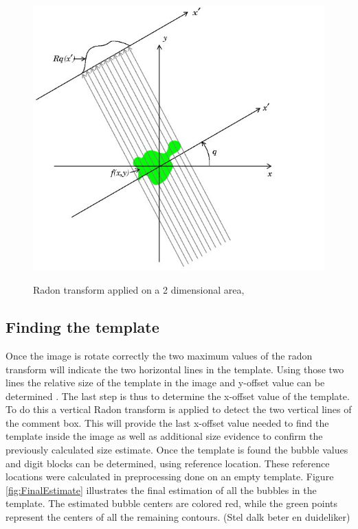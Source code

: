 \begin{figure}
  \centering
  \includegraphics[width=14cm]{RadonT}\\
  \caption{Radon transform applied on a 2 dimensional area, \citet{radon}}
  \label{fig:RadonT}
\end{figure}

\subsection{Finding the template}
\label{sec:findTemplate}

Once the image is rotate correctly the two maximum values of the radon transform will indicate the two horizontal lines in the template. Using those two lines the relative size of the template in the image and y-offset value can be determined . The last step is thus to determine the x-offset value of the template. To do this a vertical Radon transform is applied to detect the two vertical lines of the comment box. This will provide the last x-offset value needed to find the template inside the image as well as additional size evidence to confirm the previously calculated size estimate. Once the template is found the bubble values and digit blocks can be determined, using reference location. These reference locations were calculated in preprocessing done on an empty template. Figure \ref{fig:FinalEstimate} illustrates the final estimation of all the bubbles in the template. The estimated bubble centers are colored red, while the green points represent the centers of all the remaining contours. (Stel dalk beter en duideliker)

